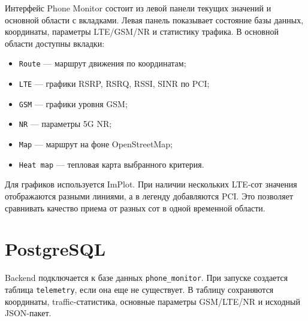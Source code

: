 \documentclass[14pt,a4paper]{extarticle}
\begin{document}
Интерфейс Phone Monitor состоит из левой панели текущих значений и основной области с вкладками. Левая панель показывает состояние базы данных, координаты, параметры LTE/GSM/NR и статистику трафика. В основной области доступны вкладки:
\begin{itemize}
    \item \texttt{Route} --- маршрут движения по координатам;
    \item \texttt{LTE} --- графики RSRP, RSRQ, RSSI, SINR по PCI;
    \item \texttt{GSM} --- графики уровня GSM;
    \item \texttt{NR} --- параметры 5G NR;
    \item \texttt{Map} --- маршрут на фоне OpenStreetMap;
    \item \texttt{Heat map} --- тепловая карта выбранного критерия.
\end{itemize}

Для графиков используется ImPlot. При наличии нескольких LTE-сот значения отображаются разными линиями, а в легенду добавляются PCI. Это позволяет сравнивать качество приема от разных сот в одной временной области.

\section{PostgreSQL}

Backend подключается к базе данных \texttt{phone\_monitor}. При запуске создается таблица \texttt{telemetry}, если она еще не существует. В таблицу сохраняются координаты, traffic-статистика, основные параметры GSM/LTE/NR и исходный JSON-пакет.
\end{document}
